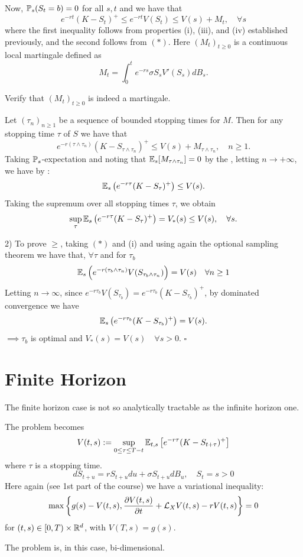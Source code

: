 \begin{remark}
    Now, $\mathbb P_s(S_t = b) = 0$ for all $s, t$ and we have that
    \[ e^{-rt}(K - S_t)^+ \leq e^{-rt} V(S_t) \leq V(s) + M_t, \quad \forall s \]
    where the first inequality follows from properties (i), (iii), and (iv) established previously, and the second follows from $(*)$. Here $(M_t)_{t \geq 0}$ is a continuous local martingale defined as
    \[ M_t = \int_0^t e^{-rs} \sigma S_s V'(S_s) dB_s. \]

    \begin{homework}
        Verify that $(M_t)_{t \geq 0}$ is indeed a martingale.
    \end{homework}

    Let $(\tau_n)_{n \geq 1}$ be a sequence of bounded stopping times for $M$. Then for any stopping time $\tau$ of $S$ we have that
    \[ e^{-r(\tau \wedge \tau_n)} (K - S_{\tau \wedge \tau_n})^+ \leq V(s) + M_{\tau \wedge \tau_n}, \quad n \geq 1. \]
    Taking $\mathbb P_s$-expectation and noting that $\mathbb E_s [M_{\tau \wedge \tau_n}] = 0$ by the , letting $n \to +\infty$, we have by :
    \[ \mathbb E_s \left(e^{-r\tau}(K - S_\tau)^+\right) \leq V(s). \]
    Taking the supremum over all stopping times $\tau$, we obtain
    \[ \sup_\tau \mathbb E_s \left(e^{-r\tau}(K - S_\tau)^+\right) = V_*(s) \leq V(s), \quad \forall s. \]
\end{remark}

\begin{remark}
    2) To prove $\geq$, taking $(*)$ and (i) and using again the optional sampling theorem we have that, $\forall \tau$ and for $\tau_b$
    \[ \mathbb E_s \left( e^{-r(\tau_b \wedge \tau_n)} V(S_{\tau_b \wedge \tau_n}) \right) = V(s) \quad \forall n \geq 1 \]
    Letting $n \to \infty$, since $e^{-r\tau_b} V(S_{\tau_b}) = e^{-r\tau_b} (K - S_{\tau_b})^+$, by dominated convergence we have
    \[ \mathbb E_s \left( e^{-r\tau_b} (K - S_{\tau_b})^+ \right) = V(s). \]
    $\implies \tau_b$ is optimal and $V_*(s) = V(s) \quad \forall s > 0$. $\square$
\end{remark}

\section{Finite Horizon}

\begin{remark}
    
    The finite horizon case is not so analytically tractable as the infinite horizon one.
    
    The problem becomes
    \[ V(t,s) := \sup_{0 \leq \tau \leq T-t} \mathbb E_{t,s} \left[ e^{-r\tau} (K - S_{t+\tau})^+ \right] \]
    where $\tau$ is a stopping time.
    \[ dS_{t+u} = r S_{t+u} du + \sigma S_{t+u} dB_u, \quad S_t = s > 0 \]
    Here again (see 1st part of the course) we have a variational inequality:
    \[ \max \left\{ g(s) - V(t,s), \frac{\partial V(t,s)}{\partial t} + \mathcal{L}_X V(t,s) - r V(t,s) \right\} = 0 \]
    for $(t,s) \in [0,T) \times \mathbb R^d$, with $V(T,s) = g(s)$.
    
    The problem is, in this case, bi-dimensional.
\end{remark}


